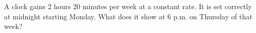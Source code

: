 A clock gains 2 hours 20 minutes per week at a constant rate. It is set correctly at midnight starting Monday. What does it show at 6 p.m. on Thursday of that week?
